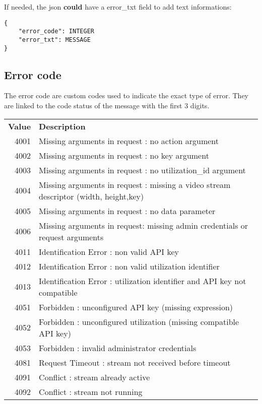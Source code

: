 If needed, the json {\bfseries could} have a {\ttfamily error\-\_\-txt} field to add text informations\-: \begin{verbatim}{
    "error_code": INTEGER
    "error_txt": MESSAGE
}
\end{verbatim}


\subsection*{Error code }

The error code are custom codes used to indicate the exact type of error. They are linked to the code status of the message with the first 3 digits.

\begin{tabular}{|r|l|}
\hline
\textbf{Value}&\textbf{Description}\\\cline{1-2}
4001 &Missing arguments in request \-: no action argument \\\cline{1-2}
4002 &Missing arguments in request \-: no key argument \\\cline{1-2}
4003 &Missing arguments in request \-: no utilization\-\_\-id argument \\\cline{1-2}
4004 &Missing arguments in request \-: missing a video stream descriptor (width, height,key) \\\cline{1-2}
4005 &Missing arguments in request \-: no data parameter \\\cline{1-2}
4006 &Missing arguments in request\-: missing admin credentials or request arguments \\\cline{1-2}
4011 &Identification Error \-: non valid A\-P\-I key \\\cline{1-2}
4012 &Identification Error \-: non valid utilization identifier \\\cline{1-2}
4013 &Identification Error \-: utilization identifier and A\-P\-I key not compatible \\\cline{1-2}
4051 &Forbidden \-: unconfigured A\-P\-I key (missing expression) \\\cline{1-2}
4052 &Forbidden \-: unconfigured utilization (missing compatible A\-P\-I key) \\\cline{1-2}
4053 &Forbidden \-: invalid administrator credentials \\\cline{1-2}
4081 &Request Timeout \-: stream not received before timeout \\\cline{1-2}
4091 &Conflict \-: stream already active \\\cline{1-2}
4092 &Conflict \-: stream not running \\\cline{1-2}

\end{tabular}

